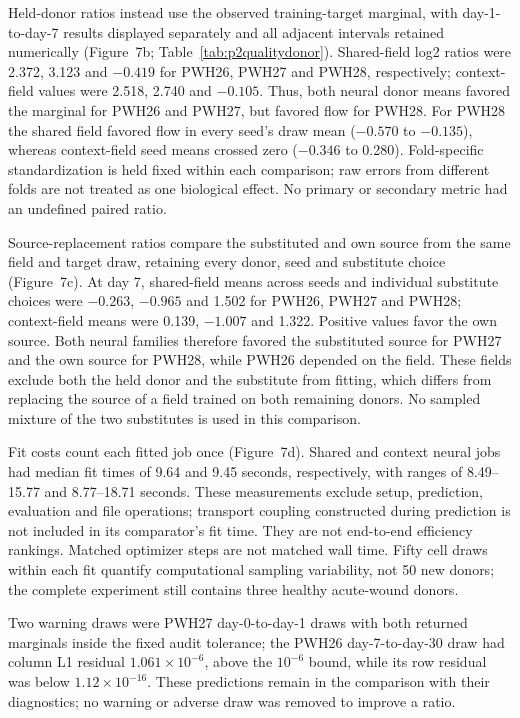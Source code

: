 \documentclass[10pt,a4paper]{article}
\begin{document}
Held-donor ratios instead use the observed training-target marginal, with day-1-to-day-7 results displayed separately and all adjacent intervals retained numerically (Figure~7b; Table~\ref{tab:p2qualitydonor}). Shared-field log2 ratios were 2.372, 3.123 and $-0.419$ for PWH26, PWH27 and PWH28, respectively; context-field values were 2.518, 2.740 and $-0.105$. Thus, both neural donor means favored the marginal for PWH26 and PWH27, but favored flow for PWH28. For PWH28 the shared field favored flow in every seed's draw mean ($-0.570$ to $-0.135$), whereas context-field seed means crossed zero ($-0.346$ to 0.280). Fold-specific standardization is held fixed within each comparison; raw errors from different folds are not treated as one biological effect. No primary or secondary metric had an undefined paired ratio.




Source-replacement ratios compare the substituted and own source from the same field and target draw, retaining every donor, seed and substitute choice (Figure~7c). At day 7, shared-field means across seeds and individual substitute choices were $-0.263$, $-0.965$ and 1.502 for PWH26, PWH27 and PWH28; context-field means were 0.139, $-1.007$ and 1.322. Positive values favor the own source. Both neural families therefore favored the substituted source for PWH27 and the own source for PWH28, while PWH26 depended on the field. These fields exclude both the held donor and the substitute from fitting, which differs from replacing the source of a field trained on both remaining donors. No sampled mixture of the two substitutes is used in this comparison.

Fit costs count each fitted job once (Figure~7d). Shared and context neural jobs had median fit times of 9.64 and 9.45 seconds, respectively, with ranges of 8.49--15.77 and 8.77--18.71 seconds. These measurements exclude setup, prediction, evaluation and file operations; transport coupling constructed during prediction is not included in its comparator's fit time. They are not end-to-end efficiency rankings. Matched optimizer steps are not matched wall time. Fifty cell draws within each fit quantify computational sampling variability, not 50 new donors; the complete experiment still contains three healthy acute-wound donors.

Two warning draws were PWH27 day-0-to-day-1 draws with both returned marginals inside the fixed audit tolerance; the PWH26 day-7-to-day-30 draw had column L1 residual $1.061\times10^{-6}$, above the $10^{-6}$ bound, while its row residual was below $1.12\times10^{-16}$. These predictions remain in the comparison with their diagnostics; no warning or adverse draw was removed to improve a ratio.
\end{document}
